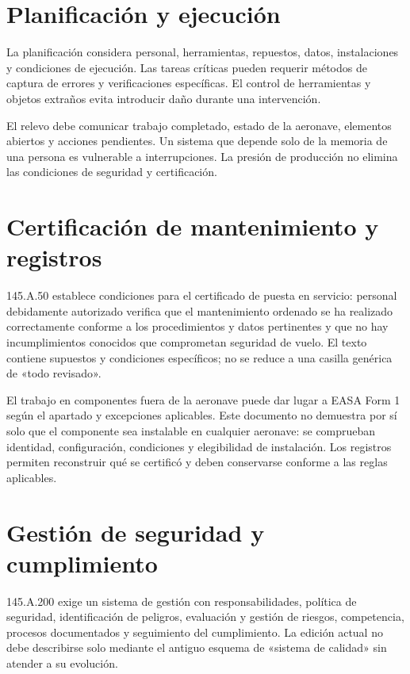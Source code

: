 \section{Planificación y ejecución}
La planificación considera personal, herramientas, repuestos, datos, instalaciones y condiciones de ejecución. Las tareas críticas pueden requerir métodos de captura de errores y verificaciones específicas. El control de herramientas y objetos extraños evita introducir daño durante una intervención.

El relevo debe comunicar trabajo completado, estado de la aeronave, elementos abiertos y acciones pendientes. Un sistema que depende solo de la memoria de una persona es vulnerable a interrupciones. La presión de producción no elimina las condiciones de seguridad y certificación.
\section{Certificación de mantenimiento y registros}
145.A.50 establece condiciones para el certificado de puesta en servicio: personal debidamente autorizado verifica que el mantenimiento ordenado se ha realizado correctamente conforme a los procedimientos y datos pertinentes y que no hay incumplimientos conocidos que comprometan seguridad de vuelo. El texto contiene supuestos y condiciones específicos; no se reduce a una casilla genérica de «todo revisado».

El trabajo en componentes fuera de la aeronave puede dar lugar a EASA Form 1 según el apartado y excepciones aplicables. Este documento no demuestra por sí solo que el componente sea instalable en cualquier aeronave: se comprueban identidad, configuración, condiciones y elegibilidad de instalación. Los registros permiten reconstruir qué se certificó y deben conservarse conforme a las reglas aplicables.
\section{Gestión de seguridad y cumplimiento}
145.A.200 exige un sistema de gestión con responsabilidades, política de seguridad, identificación de peligros, evaluación y gestión de riesgos, competencia, procesos documentados y seguimiento del cumplimiento. La edición actual no debe describirse solo mediante el antiguo esquema de «sistema de calidad» sin atender a su evolución.

